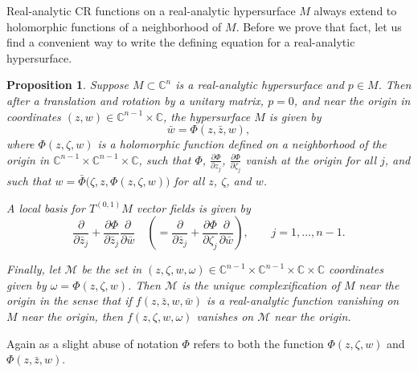 \documentclass[12pt,openany]{book}
\newcommand{\C}{{\mathbb{C}}}
\newcommand{\sM}{{\mathscr{M}}}
\theoremstyle{plain}
\newtheorem{prop}[thm]{Proposition}
\theoremstyle{remark}
\theoremstyle{definition}
\theoremstyle{exercise}
\theoremstyle{example}
\begin{document}
Real-analytic CR functions on a real-analytic
hypersurface $M$ always extend to holomorphic functions of a neighborhood of $M$.
Before we prove that fact, let us find a convenient way to write the defining
equation for a real-analytic hypersurface.

\begin{prop}
Suppose $M \subset \C^n$ is a real-analytic hypersurface and $p \in M$.
Then after a translation and rotation by a unitary matrix, $p=0$, and near
the origin in coordinates $(z,w) \in \C^{n-1} \times \C$,
the hypersurface $M$ is given by
\begin{equation*}
\bar{w} = \Phi(z,\bar{z},w) ,
\end{equation*}
where $\Phi(z,\zeta,w)$ is a holomorphic function defined on a neighborhood of the origin
in $\C^{n-1} \times \C^{n-1} \times \C$,
such that
$\Phi$,
$\frac{\partial \Phi}{\partial z_j}$,
$\frac{\partial \Phi}{\partial \zeta_j}$
vanish at the origin for all $j$,
and such that $w = \bar{\Phi}\bigl(\zeta,z,\Phi(z,\zeta,w)\bigr)$
for all $z$, $\zeta$, and $w$.

A local basis for $T^{(0,1)} M$ vector fields is given by
\begin{equation*}
\frac{\partial}{\partial \bar{z}_j}
+\frac{\partial \Phi}{\partial \bar{z}_j} \frac{\partial}{\partial \bar{w}} 
\quad
\left(
=
\frac{\partial}{\partial \bar{z}_j}
+\frac{\partial \Phi}{\partial \zeta_j} \frac{\partial}{\partial \bar{w}} 
\right)
,
\qquad j=1,\ldots,n-1.
\end{equation*}

Finally, let $\sM$ be the set in
$(z,\zeta,w,\omega) \in \C^{n-1} \times \C^{n-1} \times \C \times \C$
coordinates given
by $\omega = \Phi(z,\zeta,w)$.
Then $\sM$ is the unique \emph{complexification}
of $M$
near the origin in the sense that if $f(z,\bar{z},w,\bar{w})$
is a real-analytic function vanishing on $M$ near the origin, then 
$f(z,\zeta,w,\omega)$ vanishes on $\sM$ near the origin.
\end{prop}

Again as a slight abuse of notation $\Phi$ refers to both the function
$\Phi(z,\zeta,w)$ and $\Phi(z,\bar{z},w)$.
\end{document}
